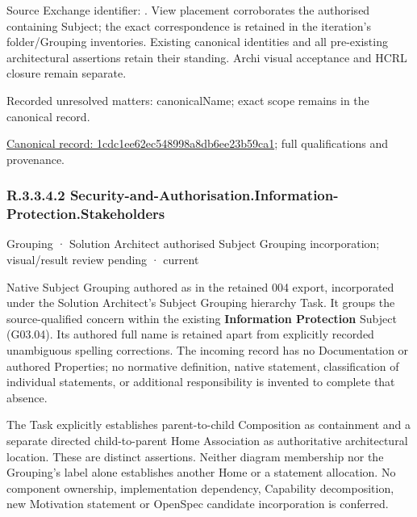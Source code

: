 Source Exchange identifier: \texttt{}. View placement corroborates
the authorised containing Subject; the exact correspondence is retained in the
iteration's folder/Grouping inventories. Existing canonical identities and all
pre-existing architectural assertions retain their standing. Archi visual
acceptance and HCRL closure remain separate.


{\small Recorded unresolved matters: canonicalName; exact scope remains in the canonical record.}\par
{\footnotesize \href{../../../../continuum/grouping/1cdc1ee62ec548998a8db6ee23b59ca1.md}{Canonical record: 1cdc1ee62ec548998a8db6ee23b59ca1}; full qualifications and provenance.}\par
\subsubsection*{R.3.3.4.2 Security-and-Authorisation.Information-Protection.Stakeholders}
\label{navigation:R.3.3.4.2}

\label{element:66ec039ab4f042a8b4817ca1dafaedfe}
{\small Grouping · Solution Architect authorised Subject Grouping incorporation; visual/result review pending · current}\par

Native Subject Grouping authored as \texttt{} in the retained 004 export,
incorporated under the Solution Architect's Subject Grouping hierarchy Task.
It groups the source-qualified \texttt{} concern within
the existing \textbf{Information Protection} Subject (G03.04). Its authored full name
is retained apart from explicitly recorded unambiguous spelling corrections.
The incoming record has no Documentation or authored Properties; no normative
definition, native statement, classification of individual statements, or
additional responsibility is invented to complete that absence.



The Task explicitly establishes parent-to-child Composition as containment and
a separate directed child-to-parent Home Association as authoritative architectural
location. These are distinct assertions. Neither diagram membership nor the
Grouping's label alone establishes another Home or a statement allocation.
No component ownership, implementation dependency, Capability decomposition,
new Motivation statement or OpenSpec candidate incorporation is conferred.



